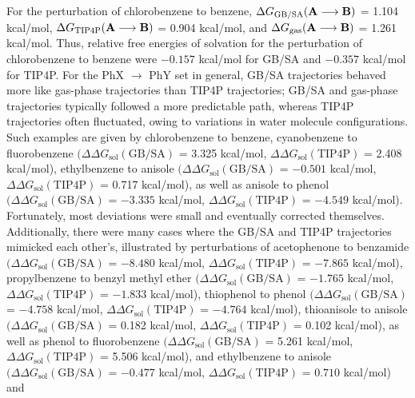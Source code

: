 \documentclass[12pt]{report}
\begin{document}
For the perturbation of 
chlorobenzene to benzene, 
$\Delta G_{\textrm{GB/SA}}(\textrm{\textbf{A}}\longrightarrow\textrm{\textbf{B}})$ = 1.104 kcal/mol, 
$\Delta G_{\textrm{TIP4P}}(\textrm{\textbf{A}}\longrightarrow\textrm{\textbf{B}})$ = 0.904 kcal/mol, and 
$\Delta G_{\textrm{gas}}(\textrm{\textbf{A}}\longrightarrow\textrm{\textbf{B}})$ = 1.261 kcal/mol. 
Thus, relative free energies of solvation for the perturbation of chlorobenzene to benzene were $-0.157$ kcal/mol for GB/SA and $-0.357$ kcal/mol for TIP4P. For the PhX $\longrightarrow$  PhY set in general, GB/SA trajectories behaved more like gas-phase trajectories than TIP4P trajectories; GB/SA and gas-phase trajectories typically followed a more predictable path, whereas TIP4P trajectories often fluctuated, owing to variations in water molecule configurations. 
Such examples are given by 
chlorobenzene to benzene, 
cyanobenzene to fluorobenzene 
$(\Delta\Delta G_{ \textrm{sol}}(\textrm{GB/SA})$ = 3.325 kcal/mol, 
$\Delta\Delta G_{ \textrm{sol}}(\textrm{TIP4P})$ = 2.408 kcal/mol), 
ethylbenzene to anisole 
$(\Delta\Delta G_{ \textrm{sol}}(\textrm{GB/SA})$ = $-0.501$ kcal/mol, 
$\Delta\Delta G_{ \textrm{sol}}(\textrm{TIP4P})$ = 0.717 kcal/mol), as well as 
anisole to phenol 
$(\Delta\Delta G_{ \textrm{sol}}(\textrm{GB/SA})$ = $-3.335$ kcal/mol, 
$\Delta\Delta G_{ \textrm{sol}}(\textrm{TIP4P})$ = $-4.549$ kcal/mol). 
Fortunately, most deviations were small and eventually corrected themselves. Additionally, there were many cases where the GB/SA and TIP4P trajectories mimicked each other's, illustrated by perturbations of 
acetophenone to benzamide 
$(\Delta\Delta G_{ \textrm{sol}}(\textrm{GB/SA})$ = $-8.480$ kcal/mol, 
$\Delta\Delta G_{ \textrm{sol}}(\textrm{TIP4P})$ = $-7.865$ kcal/mol), 
propylbenzene to benzyl methyl ether 
$(\Delta\Delta G_{ \textrm{sol}}(\textrm{GB/SA})$ = $-1.765$ kcal/mol, 
$\Delta\Delta G_{ \textrm{sol}}(\textrm{TIP4P})$ = $-1.833$ kcal/mol), 
thiophenol to phenol 
$(\Delta\Delta G_{ \textrm{sol}}(\textrm{GB/SA})$ = $-4.758$ kcal/mol, 
$\Delta\Delta G_{ \textrm{sol}}(\textrm{TIP4P})$ = $-4.764$ kcal/mol), 
thioanisole to anisole 
$(\Delta\Delta G_{ \textrm{sol}}(\textrm{GB/SA})$ = 0.182 kcal/mol, 
$\Delta\Delta G_{ \textrm{sol}}(\textrm{TIP4P})$ = 0.102 kcal/mol), 
as well as phenol to fluorobenzene 
$(\Delta\Delta G_{ \textrm{sol}}(\textrm{GB/SA})$ = 5.261 kcal/mol, 
$\Delta\Delta G_{ \textrm{sol}}(\textrm{TIP4P})$ = 5.506 kcal/mol), 
and ethylbenzene to anisole 
$(\Delta\Delta G_{ \textrm{sol}}(\textrm{GB/SA})$ = $-0.477$ kcal/mol, 
$\Delta\Delta G_{ \textrm{sol}}(\textrm{TIP4P})$ = $0.710$ kcal/mol) and 
\end{document}
